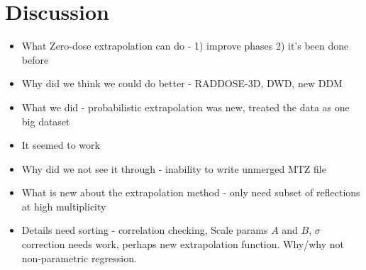 \section{Discussion}
\label{sec:Discussion - Zero-dose extrapolation}

\begin{itemize}
    \item What Zero-dose extrapolation can do - 1) improve phases 2) it's been done before
    \item Why did we think we could do better - RADDOSE-3D, DWD, new DDM
    \item What we did - probabilistic extrapolation was new, treated the data as one big dataset
    \item It seemed to work
    \item Why did we not see it through - inability to write unmerged MTZ file
    \item What is new about the extrapolation method - only need subset of reflections at high multiplicity
    \item Details need sorting - correlation checking, Scale params $A$ and $B$, $\sigma$ correction needs work, perhaps new extrapolation function. Why/why not non-parametric regression.
\end{itemize}
